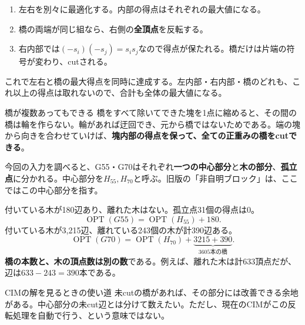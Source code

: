 \begin{enumerate}
\item 左右を別々に最適化する。内部の得点はそれぞれの最大値になる。
\item 橋の両端が同じ組なら、右側の\textbf{全頂点}を反転する。
\item 右内部では$(-s_i)(-s_j)=s_is_j$なので得点が保たれる。橋だけは片端の符号が変わり、cutされる。
\end{enumerate}
これで左右と橋の最大得点を同時に達成する。左内部・右内部・橋のどれも、これ以上の得点は取れないので、合計も全体の最大値になる。

\begin{point}{橋が複数あってもできる}
橋をすべて除いてできた塊を1点に縮めると、その間の橋は輪を作らない。輪があれば迂回でき、元から橋ではないためである。端の塊から向きを合わせていけば、\textbf{塊内部の得点を保って、全ての正重みの橋をcutできる}。
\end{point}

\newpage
{}
今回の入力を調べると、G55・G70はそれぞれ\textbf{一つの中心部分}と\textbf{木の部分}、\textbf{孤立点}に分かれる。中心部分を$H_{55},H_{70}$と呼ぶ。旧版の「非自明ブロック」は、ここではこの中心部分を指す。

付いている木が180辺あり、離れた木はない。孤立点31個の得点は0。
\[\operatorname{OPT}(G55)=\operatorname{OPT}(H_{55})+180.\]
付いている木が3,215辺、離れている243個の木が計390辺ある。
\[\operatorname{OPT}(G70)=\operatorname{OPT}(H_{70})+\underbrace{3215+390}_{3605\text{本の橋}}.\]
\textbf{橋の本数と、木の頂点数は別の数}である。例えば、離れた木は計633頂点だが、辺は$633-243=390$本である。

\begin{point}{CIMの解を見るときの使い道}
未cutの橋があれば、その部分には改善できる余地がある。中心部分の未cut辺とは分けて数えたい。ただし、現在のCIMがこの反転処理を自動で行う、という意味ではない。
\end{point}

